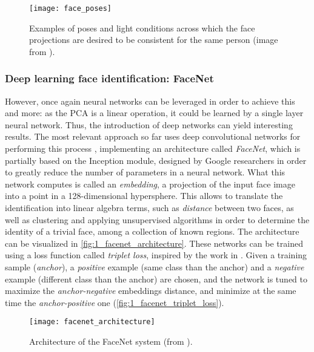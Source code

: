 \begin{figure}[h]
	\centering
	\texttt{[image: face\_poses]}
	\caption{Examples of poses and light conditions across which the face projections are desired to be consistent for the same person (image from \cite{facenet}).}
	\label{fig:1_faces_poses}
\end{figure}
\vspace{4cm}
\subsubsection{Deep learning face identification: FaceNet}
\label{sec:1_facenet}
However, once again neural networks can be leveraged in order to achieve this and more: as the PCA is a linear operation, it could be learned by a single layer neural network. Thus, the introduction of deep networks can yield interesting results. The most relevant approach so far uses deep convolutional networks for performing this process \cite{facenet}, implementing an architecture called \textit{FaceNet}, which is partially based on the Inception \cite{inception} module, designed by Google researchers in order to greatly reduce the number of parameters in a neural network. What this network computes is called an \textit{embedding}, a projection of the input face image into a point in a 128-dimensional hypersphere. This allows to translate the identification into linear algebra terms, such as \textit{distance} between two faces, as well as clustering and applying unsupervised algorithms in order to determine the identity of a trivial face, among a collection of known regions. The architecture can be visualized in \autoref{fig:1_facenet_architecture}. These networks can be trained using a loss function called \textit{triplet loss}, inspired by the work in \cite{lmnn_loss}. Given a training sample (\textit{anchor}), a \textit{positive} example (same class than the anchor) and a \textit{negative} example (different class than the anchor) are chosen, and the network is tuned to maximize the \textit{anchor-negative} embeddings distance, and minimize at the same time the \textit{anchor-positive} one (\autoref{fig:1_facenet_triplet_loss}).


\begin{figure}[h]
	\centering
	\texttt{[image: facenet\_architecture]}
	\caption{Architecture of the FaceNet system (from \cite{facenet}).}
	\label{fig:1_facenet_architecture}
\end{figure}



